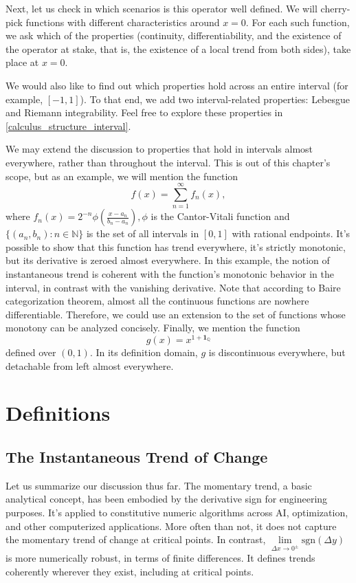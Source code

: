 \documentclass[11pt]{book}
\begin{document}
Next, let us check in which scenarios is this operator well defined. We will cherry-pick functions with different characteristics around $x=0$. For each such function, we ask which of the properties (continuity, differentiability, and the existence of the operator at stake, that is, the existence of a local trend from both sides), take place at $x=0$.

We would also like to find out which properties hold across an entire interval (for example, $[-1,1]$). To that end, we add two interval-related properties: Lebesgue and Riemann integrability. Feel free to explore these properties in \ref{calculus_structure_interval}.

We may extend the discussion to properties that hold in intervals almost everywhere, rather than throughout the interval. This is out of this chapter's scope, but as an example, we will mention the function $$f(x)=\sum\limits_{n=1}^{\infty}f_n(x),$$ where $f_n(x)=2^{-n}\phi\left(\frac{x-a_n}{b_n-a_n}\right)
, \phi$ is the Cantor-Vitali function and $\{(a_n,b_n):n\in\mathbb{N}\}$ is the set of all intervals in $\left[0,1\right]$ with rational endpoints. It's possible to show that this function has trend everywhere, it's strictly monotonic, but its derivative is zeroed almost everywhere. In this example, the notion of instantaneous trend is coherent with the function's monotonic behavior in the interval, in contrast with the vanishing derivative. Note that according to Baire categorization theorem, almost all the continuous functions are nowhere differentiable. Therefore, we could use an extension to the set of functions whose monotony can be analyzed concisely. Finally, we mention the function $$g\left(x\right)=x^{1+\boldsymbol{1}_{\mathbb{Q}}}$$ defined over $\left(0,1\right)$. In its definition domain, $g$ is discontinuous everywhere, but detachable from left almost everywhere.

\section{Definitions}
\subsection{The Instantaneous Trend of Change}

Let us summarize our discussion thus far. The momentary trend, a basic analytical concept, has been embodied by the derivative sign for engineering purposes. It's applied to constitutive numeric algorithms across AI, optimization, and other computerized applications. More often than not, it does not capture the momentary trend of change at critical points. In contrast, $\underset{\Delta x\rightarrow0^{\pm}}{\lim}\text{sgn}\left(\Delta y\right)$ is more numerically robust, in terms of finite differences. It defines trends coherently wherever they exist, including at critical points. 
\end{document}
